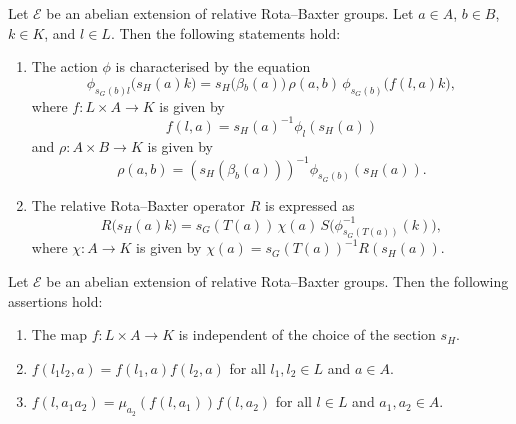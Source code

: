 \documentclass{jonasart}
\theoremstyle{plain}
\begin{document}
	\begin{proposition}
		[\!{\cite[p.11]
			{MR4819014}}] \label{f rho chi eqn}
		Let $\mathcal{E}$ be an abelian extension of relative Rota--Baxter groups. Let $a \in A$, $b \in B$, $k \in K$, and $l \in L$. Then the following statements hold:
		\begin{enumerate}
			\item The action $\phi$ is characterised by the equation
			\begin{equation}
				\phi_{s_G (b)l} \big(s_H (a)k \big) = s_H \big(\beta{_b (a)} \big) \, \rho(a,b) \, \phi_{s_G (b)} \big(f(l,a)k\big),
			\end{equation}
			where $f: L \times A \rightarrow K$ is given by
			\[
			f(l,a) = s_H(a)^{-1} \phi_l(s_H(a))
			\]
			and $\rho: A \times B \rightarrow K$ is given by
			\[
			\rho(a,b) = (s_H(\beta_b(a)))^{-1}\phi_{s_G(b)}(s_H(a)).
			\]
			
			\item The relative Rota--Baxter operator $R$ is expressed as
			\begin{equation}
				R \big(s_H (a)k \big) = s_G (T(a)) \, \chi(a) \, S \big(\phi^{-1}_{s_G (T(a))}(k) \big),
			\end{equation}
			where $\chi: A \rightarrow K$ is given by $\chi(a)=s_G (T(a))^{-1}R(s_H (a))$.
		\end{enumerate}
		
	\end{proposition}
	
	\begin{lemma}[\!\!{\cite[Lemma 3.9]{MR4819014}}] \label{properties of f}
		Let $\mathcal{E}$ be an abelian extension of relative Rota--Baxter groups. Then the following assertions hold:
		\begin{enumerate}
			\item The map $f: L \times A \longrightarrow K$ is independent of the choice of the section $s_H$.
			\item $f(l_1 l_2,a) = f( l_1, a)f( l_2,a)$ for all $l_1, l_2 \in L$ and $a \in A$.
			\item $f(l, a_1 a_2 ) = \mu_{ a_2}(f(l,a_1 ))f(l, a_2 )$ for all $l \in L$ and $a_1, a_2 \in A$.
		\end{enumerate}
	\end{lemma}
	
\end{document}
